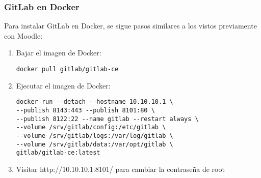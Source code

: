 \subsubsection{GitLab en Docker}
Para instalar GitLab en Docker, se sigue pasos similares a los vistos previamente con Moodle:
\begin{enumerate}
	\item Bajar el imagen de Docker:
    \begin{lstlisting}    
docker pull gitlab/gitlab-ce
    \end{lstlisting}
    \item Ejecutar el imagen de Docker:
    \begin{lstlisting}    
docker run --detach --hostname 10.10.10.1 \
--publish 8143:443 --publish 8101:80 \
--publish 8122:22 --name gitlab --restart always \
--volume /srv/gitlab/config:/etc/gitlab \
--volume /srv/gitlab/logs:/var/log/gitlab \
--volume /srv/gitlab/data:/var/opt/gitlab \
gitlab/gitlab-ce:latest
    \end{lstlisting}
    \item Visitar http://10.10.10.1:8101/ para cambiar la contraseña de root
\end{enumerate}

